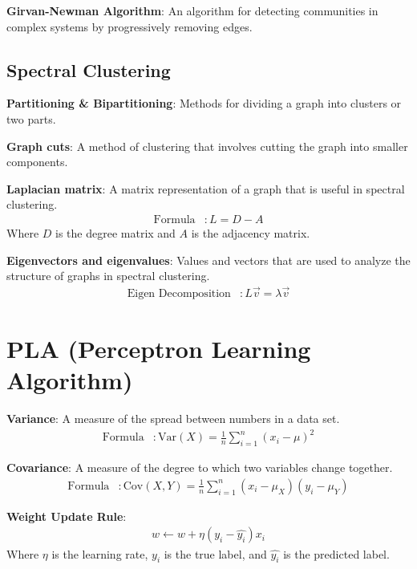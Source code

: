 \documentclass{article}
\begin{document}
\textbf{Girvan-Newman Algorithm}: An algorithm for detecting communities in complex systems by progressively removing edges.

\subsection{Spectral Clustering}
\textbf{Partitioning \& Bipartitioning}: Methods for dividing a graph into clusters or two parts.

\textbf{Graph cuts}: A method of clustering that involves cutting the graph into smaller components.

\textbf{Laplacian matrix}: A matrix representation of a graph that is useful in spectral clustering.
\begin{align*}
    \text{Formula} &: L = D - A
\end{align*}
Where \( D \) is the degree matrix and \( A \) is the adjacency matrix.

\textbf{Eigenvectors and eigenvalues}: Values and vectors that are used to analyze the structure of graphs in spectral clustering.
\begin{align*}
    \text{Eigen Decomposition} &: L \vec{v} = \lambda \vec{v}
\end{align*}

\section{PLA (Perceptron Learning Algorithm)}

\textbf{Variance}: A measure of the spread between numbers in a data set.
\begin{align*}
    \text{Formula} &: \text{Var}(X) = \frac{1}{n} \sum_{i=1}^{n} (x_i - \mu)^2
\end{align*}

\textbf{Covariance}: A measure of the degree to which two variables change together.
\begin{align*}
    \text{Formula} &: \text{Cov}(X, Y) = \frac{1}{n} \sum_{i=1}^{n} (x_i - \mu_X)(y_i - \mu_Y)
\end{align*}

\textbf{Weight Update Rule}: 
\begin{align*}
    w \leftarrow w + \eta (y_i - \hat{y_i}) x_i
\end{align*}
Where \( \eta \) is the learning rate, \( y_i \) is the true label, and \( \hat{y_i} \) is the predicted label.
\end{document}
